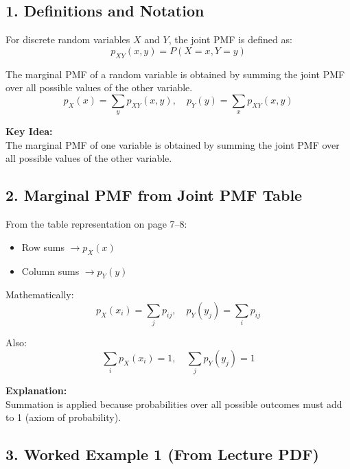 \documentclass[11pt]{article}
\begin{document}
\subsection*{1. Definitions and Notation}

\begin{tcolorbox}[colback=blue!5!white,colframe=blue!75!black,title=\textbf{Definition 1.1 (Joint PMF):}]
For discrete random variables $X$ and $Y$, the joint PMF is defined as:
\[
p_{XY}(x,y) = P(X=x, Y=y)
\]
\end{tcolorbox}

\begin{tcolorbox}[colback=blue!5!white,colframe=blue!75!black,title=\textbf{Definition 1.2 (Marginal PMF):}]
The marginal PMF of a random variable is obtained by summing the joint PMF over all possible values of the other variable.
\[
p_X(x) = \sum_y p_{XY}(x,y), \quad p_Y(y) = \sum_x p_{XY}(x,y)
\]
\end{tcolorbox}

\noindent\textbf{Key Idea:}\\
The marginal PMF of one variable is obtained by summing the joint PMF over all possible values of the other variable.

\subsection*{2. Marginal PMF from Joint PMF Table}

From the table representation on page 7–8:
\begin{itemize}
    \item Row sums $\rightarrow p_X(x)$
    \item Column sums $\rightarrow p_Y(y)$
\end{itemize}

\noindent Mathematically:
\[
p_X(x_i) = \sum_j p_{ij}, \quad p_Y(y_j) = \sum_i p_{ij}
\]

\noindent Also:
\[
\sum_i p_X(x_i) = 1, \quad \sum_j p_Y(y_j) = 1
\]

\noindent\textbf{Explanation:}\\
Summation is applied because probabilities over all possible outcomes must add to 1 (axiom of probability).

\newpage

\subsection*{3. Worked Example 1 (From Lecture PDF)}
\end{document}
